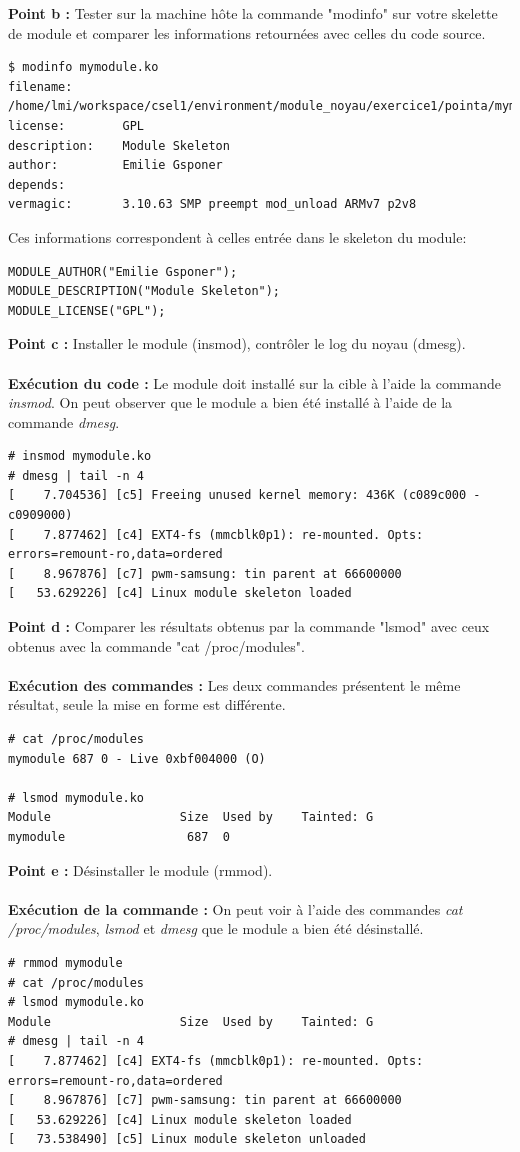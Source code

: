 \textbf{Point b :} Tester sur la machine hôte la commande "modinfo" sur	votre	skelette de	module et comparer les	informations retournées	avec celles	du	code source.
\begin{lstlisting}
$ modinfo mymodule.ko
filename:       /home/lmi/workspace/csel1/environment/module_noyau/exercice1/pointa/mymodule.ko
license:        GPL
description:    Module Skeleton
author:         Emilie Gsponer
depends:        
vermagic:       3.10.63 SMP preempt mod_unload ARMv7 p2v8 
\end{lstlisting}
Ces informations correspondent à celles entrée dans le skeleton du module:
\begin{lstlisting}
MODULE_AUTHOR("Emilie Gsponer");
MODULE_DESCRIPTION("Module Skeleton");
MODULE_LICENSE("GPL");
\end{lstlisting}
\textbf{Point c :} Installer	le	module (insmod),	contrôler	le	log	du	noyau	(dmesg).\\\\
\textbf{Exécution du code : }Le module doit installé sur la cible à l'aide la commande \textit{insmod}. On peut observer que le module a bien été installé à l'aide de la commande \textit{dmesg}.
\begin{lstlisting}
# insmod mymodule.ko
# dmesg | tail -n 4
[    7.704536] [c5] Freeing unused kernel memory: 436K (c089c000 - c0909000)
[    7.877462] [c4] EXT4-fs (mmcblk0p1): re-mounted. Opts: errors=remount-ro,data=ordered
[    8.967876] [c7] pwm-samsung: tin parent at 66600000
[   53.629226] [c4] Linux module skeleton loaded

\end{lstlisting}
\textbf{Point d :} Comparer	les	résultats	obtenus	par	la	commande	"lsmod"	avec	ceux	obtenus	avec	la	commande	"cat /proc/modules".\\\\
\textbf{Exécution des commandes : } Les deux commandes présentent le même résultat, seule la mise en forme est différente.
\begin{lstlisting}
# cat /proc/modules
mymodule 687 0 - Live 0xbf004000 (O)

# lsmod mymodule.ko
Module                  Size  Used by    Tainted: G  
mymodule                 687  0 
\end{lstlisting}
\textbf{Point e :} Désinstaller	le	module	(rmmod).\\\\
\textbf{Exécution de la commande : } On peut voir à l'aide des commandes \textit{cat /proc/modules}, \textit{lsmod} et \textit{dmesg} que le module a bien été désinstallé.
\begin{lstlisting}
# rmmod mymodule
# cat /proc/modules
# lsmod mymodule.ko
Module                  Size  Used by    Tainted: G  
# dmesg | tail -n 4
[    7.877462] [c4] EXT4-fs (mmcblk0p1): re-mounted. Opts: errors=remount-ro,data=ordered
[    8.967876] [c7] pwm-samsung: tin parent at 66600000
[   53.629226] [c4] Linux module skeleton loaded
[   73.538490] [c5] Linux module skeleton unloaded
\end{lstlisting}

